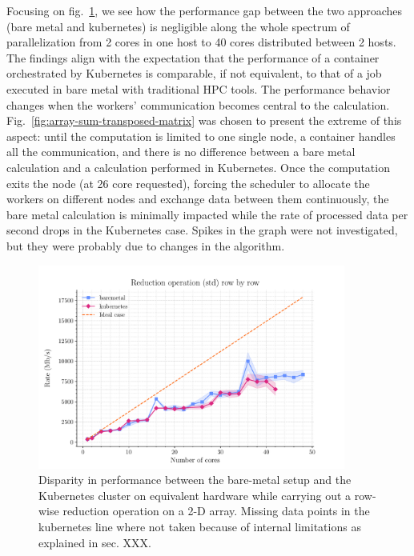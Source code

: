 Focusing on fig.~\ref{fig:array-reduction-std-along-axis}, we see how the
performance gap between the two approaches (bare metal and kubernetes) is
negligible along the whole spectrum of parallelization from 2 cores in one host
to 40 cores distributed between 2 hosts. The findings align with the expectation
that the performance of a container orchestrated by Kubernetes is comparable, if
not equivalent, to that of a job executed in bare metal with traditional HPC
tools. The performance behavior changes when the workers' communication becomes
central to the calculation. Fig.~\ref{fig:array-sum-transposed-matrix} was
chosen to present the extreme of this aspect: until the computation is limited
to one single node, a container handles all the communication, and there is no
difference between a bare metal calculation and a calculation performed in
Kubernetes. Once the computation exits the node (at 26 core requested), forcing
the scheduler to allocate the workers on different nodes and exchange data
between them continuously, the bare metal calculation is minimally impacted
while the rate of processed data per second drops in the Kubernetes case. Spikes
in the graph were not investigated, but they were probably due to changes in the
algorithm.


\begin{figure}
  \centering
  \includegraphics[width=0.9\textwidth]{img/chpt4/array-reduction-std-along-axis}
  \caption{Disparity in performance between the bare-metal setup and the
    Kubernetes cluster on equivalent hardware while carrying out a row-wise
    reduction operation on a 2-D array. Missing data points in the kubernetes
    line where not taken because of internal limitations as explained in sec. XXX. }
  \label{fig:array-reduction-std-along-axis}
\end{figure}


